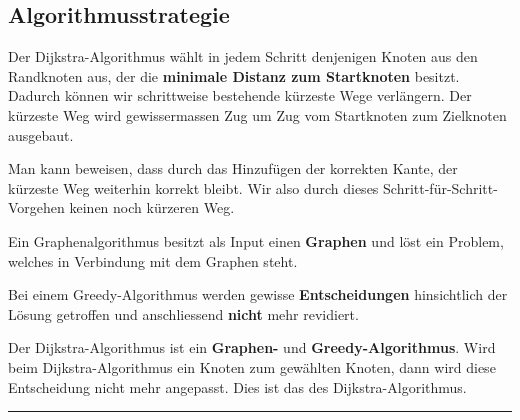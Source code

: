 \subsection{Algorithmusstrategie}

Der Dijkstra-Algorithmus wählt in jedem Schritt denjenigen Knoten aus den Randknoten aus, der die \textbf{minimale Distanz zum Startknoten} besitzt. Dadurch können wir schrittweise bestehende kürzeste Wege verlängern. Der kürzeste Weg wird gewissermassen Zug um Zug vom Startknoten zum Zielknoten ausgebaut. 

\begin{important}
	Man kann beweisen, dass durch das Hinzufügen der korrekten Kante, der  kürzeste Weg weiterhin korrekt bleibt. Wir  also durch dieses Schritt-für-Schritt-Vorgehen keinen noch kürzeren Weg.
\end{important}

\begin{definition}[Graphenalgorithmus]
	Ein Graphenalgorithmus besitzt als Input einen \textbf{Graphen} und löst ein Problem, welches in Verbindung mit dem Graphen steht.
\end{definition}

\begin{definition}
Bei einem Greedy-Algorithmus werden gewisse \textbf{Entscheidungen} hinsichtlich der Lösung getroffen und anschliessend \textbf{nicht} mehr revidiert.
\end{definition}

Der Dijkstra-Algorithmus ist ein \textbf{Graphen-} und \textbf{Greedy-Algorithmus}. Wird beim Dijkstra-Algorithmus ein Knoten zum gewählten Knoten, dann wird diese Entscheidung nicht mehr angepasst. Dies ist das  des Dijkstra-Algorithmus.

\rule{5cm}{0.4pt}

